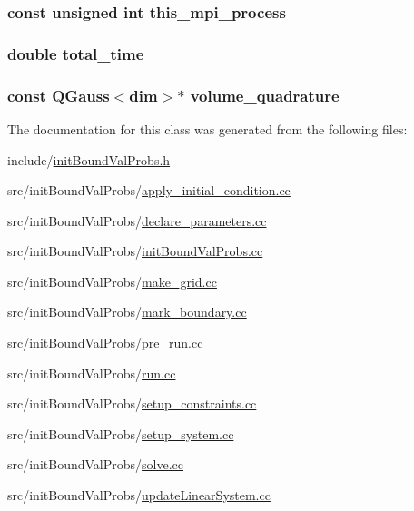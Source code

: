 \subsubsection[{this\-\_\-mpi\-\_\-process}]{\setlength{\rightskip}{0pt plus 5cm}const unsigned int this\-\_\-mpi\-\_\-process}\label{classinit_bound_val_probs_a6c34addfd3b89faf0a7b4e3fe1236fb0}
\subsubsection[{total\-\_\-time}]{\setlength{\rightskip}{0pt plus 5cm}double total\-\_\-time}\label{classinit_bound_val_probs_abc276e47b85df9dd59f248e663b3b971}
\subsubsection[{volume\-\_\-quadrature}]{\setlength{\rightskip}{0pt plus 5cm}const Q\-Gauss$<$dim$>$$\ast$ volume\-\_\-quadrature}\label{classinit_bound_val_probs_a7e2363a91f6f1626f463f3a06108c03b}


The documentation for this class was generated from the following files\-:\begin{DoxyCompactItemize}
\item 
include/\hyperlink{init_bound_val_probs_8h}{init\-Bound\-Val\-Probs.\-h}\item 
src/init\-Bound\-Val\-Probs/\hyperlink{apply__initial__condition_8cc}{apply\-\_\-initial\-\_\-condition.\-cc}\item 
src/init\-Bound\-Val\-Probs/\hyperlink{init_bound_val_probs_2declare__parameters_8cc}{declare\-\_\-parameters.\-cc}\item 
src/init\-Bound\-Val\-Probs/\hyperlink{init_bound_val_probs_8cc}{init\-Bound\-Val\-Probs.\-cc}\item 
src/init\-Bound\-Val\-Probs/\hyperlink{make__grid_8cc}{make\-\_\-grid.\-cc}\item 
src/init\-Bound\-Val\-Probs/\hyperlink{mark__boundary_8cc}{mark\-\_\-boundary.\-cc}\item 
src/init\-Bound\-Val\-Probs/\hyperlink{pre__run_8cc}{pre\-\_\-run.\-cc}\item 
src/init\-Bound\-Val\-Probs/\hyperlink{run_8cc}{run.\-cc}\item 
src/init\-Bound\-Val\-Probs/\hyperlink{setup__constraints_8cc}{setup\-\_\-constraints.\-cc}\item 
src/init\-Bound\-Val\-Probs/\hyperlink{setup__system_8cc}{setup\-\_\-system.\-cc}\item 
src/init\-Bound\-Val\-Probs/\hyperlink{solve_8cc}{solve.\-cc}\item 
src/init\-Bound\-Val\-Probs/\hyperlink{update_linear_system_8cc}{update\-Linear\-System.\-cc}\end{DoxyCompactItemize}
